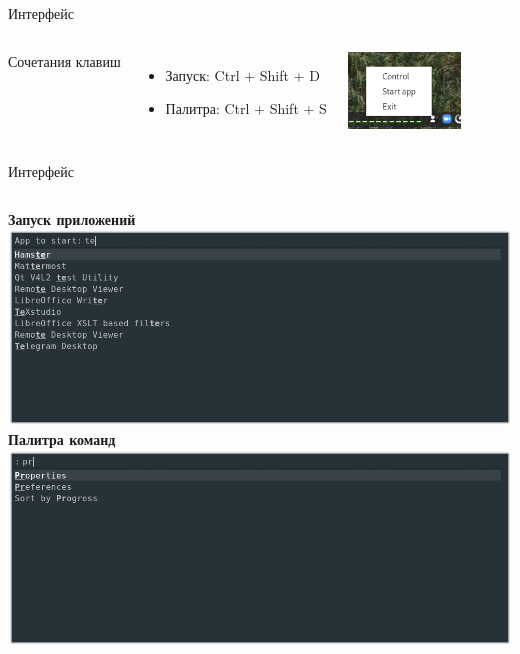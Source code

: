 \documentclass[aspectratio=1610]{beamer}
\begin{document}

\begin{frame}{Интерфейс}
    \begin{columns}
		Сочетания клавиш
		\begin{itemize}
			\item Запуск: Ctrl + Shift + D
			\item Палитра: Ctrl + Shift + S
		\end{itemize}
		\includegraphics[width=3cm]{tray_ui}
	\end{columns} 
\end{frame}

\begin{frame}{Интерфейс}
    \begin{columns}
		\textbf{Запуск приложений}
		\centering
		\includegraphics[width=\textwidth]{start_ui}
		\textbf{Палитра команд}
		\centering
		\includegraphics[width=\textwidth]{control_ui}
	\end{columns}
\end{frame}
\end{document}
